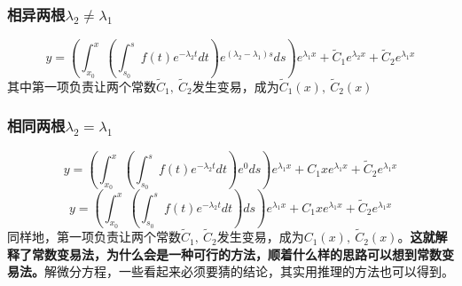 \documentclass[UTF8]{ctexart}
\begin{document}
\subsubsection{相异两根$\lambda _2 \neq \lambda _1$}
\[y=\left(\int^x_{x_0}\left(\int_{s_0}^s f(t)e^{-\lambda _2t}dt\right)e^{(\lambda _2-\lambda _1)s}ds\right)e^{\lambda _1x}+\tilde C_1e^{\lambda _2x}+\tilde C_2e^{\lambda _1 x}\]
其中第一项负责让两个常数$\tilde C_1,\ \tilde C_2$发生变易，成为$\tilde C_1(x),\ \tilde C_2(x)$
\subsubsection{相同两根$\lambda _2 = \lambda _1$}
\[y=\left(\int^x_{x_0}\left(\int_{s_0}^s f(t)e^{-\lambda _2t}dt\right)e^{0}ds\right)e^{\lambda _1x}+ C_1xe^{\lambda _1x}+\tilde C_2e^{\lambda _1 x}\]
\[y=\left(\int^x_{x_0}\left(\int_{s_0}^s f(t)e^{-\lambda _2t}dt\right)ds\right)e^{\lambda _1x}+ C_1xe^{\lambda _1x}+\tilde C_2e^{\lambda _1 x}\]
同样地，第一项负责让两个常数$\tilde C_1,\ \tilde C_2$发生变易，成为$ C_1(x),\ \tilde C_2(x)$。\textbf{这就解释了常数变易法，为什么会是一种可行的方法，顺着什么样的思路可以想到常数变易法。}解微分方程，一些看起来必须要猜的结论，其实用推理的方法也可以得到。
\end{document}
